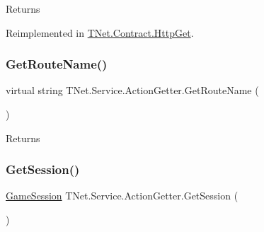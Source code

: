 \begin{DoxyReturn}{Returns}

\end{DoxyReturn}


Reimplemented in \mbox{\hyperlink{class_t_net_1_1_contract_1_1_http_get_a7af9627d277a09b1a43cf88e62e86ba3}{T\+Net.\+Contract.\+Http\+Get}}.

\mbox{\label{class_t_net_1_1_service_1_1_action_getter_aec5042cf79994966cc93ce581e98acba}} 
\subsubsection{\texorpdfstring{Get\+Route\+Name()}{GetRouteName()}}
{\footnotesize\ttfamily virtual string T\+Net.\+Service.\+Action\+Getter.\+Get\+Route\+Name (\begin{DoxyParamCaption}{ }\end{DoxyParamCaption})\hspace{0.3cm}{\ttfamily [virtual]}}





\begin{DoxyReturn}{Returns}

\end{DoxyReturn}
\mbox{\label{class_t_net_1_1_service_1_1_action_getter_aca0c42abc01b4f8b2e4e302dbb31098a}} 
\subsubsection{\texorpdfstring{Get\+Session()}{GetSession()}}
{\footnotesize\ttfamily \mbox{\hyperlink{class_t_net_1_1_contract_1_1_game_session}{Game\+Session}} T\+Net.\+Service.\+Action\+Getter.\+Get\+Session (\begin{DoxyParamCaption}{ }\end{DoxyParamCaption})}






